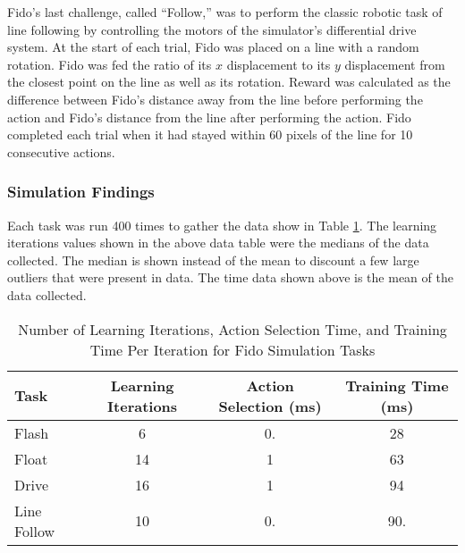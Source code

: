 Fido's last challenge, called ``Follow,'' was to perform the classic robotic task of line following by controlling the motors of the simulator's differential drive system.
At the start of each trial, Fido was placed on  a line with a random rotation.
Fido was fed the ratio of its $x$ displacement to its $y$ displacement from the closest point on the line as well as its rotation.
Reward was calculated as the difference between Fido's distance away from the line before performing the action and Fido's distance from the line after performing the action.
Fido completed each trial when it had stayed within 60 pixels of the line for 10 consecutive actions.

\subsubsection{Simulation Findings}

Each task was run 400 times to gather the data show in Table \ref{tab:data}.
The learning iterations values shown in the above data table were the medians of the data collected.
The median is shown instead of the mean to discount a few large outliers that were present in data.
The time data shown above is the mean of the data collected.

\begin{table}[ht]
	\centering
	\begin{tabular}{@{}lccc@{}}
		\toprule
		Task        & Learning Iterations & Action Selection (ms) & Training Time (ms) \\ \midrule
		Flash       & 6                   & 0.                 & 28                    \\
		Float       & 14                  & 1                  & 63                    \\
		Drive       & 16                  & 1                  & 94                    \\
		Line Follow & 10                  & 0.                 & 90.				   \\ \bottomrule
	\end{tabular}
	\caption{Number of Learning Iterations, Action Selection Time, and Training Time Per Iteration for Fido Simulation Tasks}
	\label{tab:data}
\end{table}

